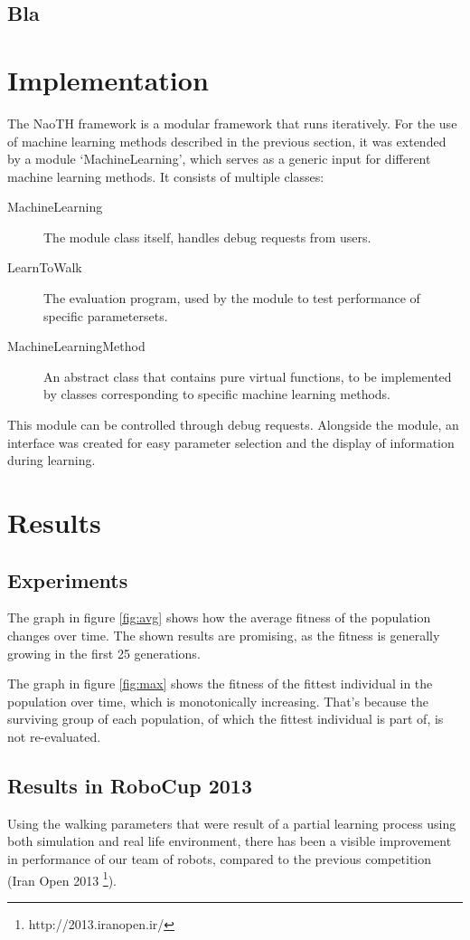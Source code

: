 \documentclass[a4paper, twocolumn]{article}
\begin{document}
\subsection{Bla}

\section{Implementation}
The NaoTH framework is a modular framework that runs iteratively.  For the use of machine learning methods described in the previous section, it was extended by a module `MachineLearning', which serves as a generic input for different machine learning methods. It consists of multiple classes:
\begin{description}
\item[MachineLearning] The module class itself, handles debug requests from users.
\item[LearnToWalk] The evaluation program, used by the module to test performance of specific parametersets.
\item[MachineLearningMethod] An abstract class that contains pure virtual functions, to be implemented by classes corresponding to specific machine learning methods.
\end{description}

This module can be controlled through debug requests. Alongside the module, an interface was created for easy parameter selection and the display of information during learning.


\section{Results}

\subsection{Experiments}
The graph in figure \ref{fig:avg} shows how the average fitness of the population changes over time. The shown results are promising, as the fitness is generally growing in the first 25 generations. 

The graph in figure \ref{fig:max} shows the fitness of the fittest individual in the population over time, which is monotonically increasing. That's because the surviving group of each population, of which the fittest individual is part of, is not re-evaluated. 

\subsection{Results in RoboCup 2013}
Using the walking parameters that were result of a partial learning process using both simulation and real life environment, there has been a visible improvement in performance of our team of robots, compared to the previous competition (Iran Open 2013  \footnote{http://2013.iranopen.ir/}). 
\end{document}
